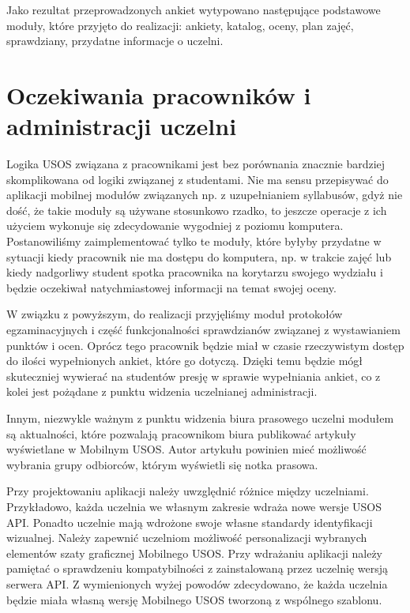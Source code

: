 \documentclass{pracamgr}
\begin{document}
Jako rezultat przeprowadzonych ankiet wytypowano następujące podstawowe moduły,
które przyjęto do realizacji: ankiety, katalog, oceny, plan zajęć, sprawdziany,
przydatne informacje o uczelni.

\section{Oczekiwania pracowników i administracji uczelni}

Logika USOS związana z pracownikami jest bez porównania znacznie bardziej
skomplikowana od logiki związanej z studentami. Nie ma sensu przepisywać do
aplikacji mobilnej modułów związanych np. z uzupełnianiem syllabusów, gdyż
nie dość, że takie moduły są używane stosunkowo rzadko, to jeszcze operacje
z ich użyciem wykonuje się zdecydowanie wygodniej z poziomu komputera. Postanowiliśmy
zaimplementować tylko te moduły, które byłyby przydatne w sytuacji kiedy pracownik
nie ma dostępu do komputera, np. w trakcie zajęć lub kiedy nadgorliwy student
spotka pracownika na korytarzu swojego wydziału i będzie oczekiwał natychmiastowej
informacji na temat swojej oceny.

W związku z powyższym, do realizacji przyjęliśmy moduł protokołów egzaminacyjnych
i część funkcjonalności sprawdzianów związanej z wystawianiem punktów i ocen.
Oprócz tego pracownik będzie miał w czasie rzeczywistym dostęp do ilości wypełnionych
ankiet, które go dotyczą. Dzięki temu będzie mógł skuteczniej wywierać na studentów
presję w sprawie wypełniania ankiet, co z kolei jest pożądane z punktu widzenia
uczelnianej administracji.

Innym, niezwykle ważnym z punktu widzenia biura prasowego uczelni modułem są
aktualności, które pozwalają pracownikom biura publikować artykuły wyświetlane
w Mobilnym USOS. Autor artykułu powinien mieć możliwość wybrania grupy odbiorców,
którym wyświetli się notka prasowa.

Przy projektowaniu aplikacji należy uwzględnić różnice między uczelniami.
Przykładowo, każda uczelnia we własnym zakresie wdraża nowe wersje USOS API.
Ponadto uczelnie mają wdrożone swoje własne standardy identyfikacji wizualnej.
Należy zapewnić uczelniom możliwość personalizacji wybranych elementów szaty
graficznej Mobilnego USOS. Przy wdrażaniu aplikacji należy pamiętać o
sprawdzeniu kompatybilności z zainstalowaną przez uczelnię wersją serwera API.
Z wymienionych wyżej powodów zdecydowano, że każda uczelnia będzie miała własną
wersję Mobilnego USOS tworzoną z wspólnego szablonu.
\end{document}
